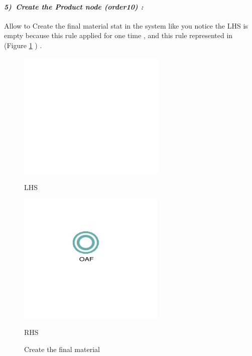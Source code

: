 \paragraph{\emph{5)~Create the Product node (order10) :} }
 
 
Allow to Create the final material stat in the system like you notice the LHS is empty because this rule applied for one time , and this rule represented in 
(Figure \ref{fig:Create the final material} ) .


\vspace{1cm}
\begin{figure}[th]
\centering
\begin{minipage}{.6\textwidth}
 
  \includegraphics[width=.7\linewidth]{Chapiter3/img/L5}
  \linebreak

\hspace{2cm}  LHS
 
  
\end{minipage}%
\begin{minipage}{.6\textwidth}
 
  \includegraphics[width=.7\linewidth]{Chapiter3/img/R5}
\linebreak  

\hspace{2.5cm}  RHS 
 
\end{minipage}
\caption{\label{fig:Create the final material}Create the final material}
 
\end{figure}
